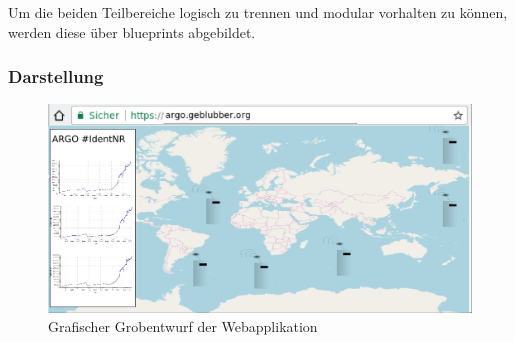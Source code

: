Um die beiden Teilbereiche logisch zu trennen und modular vorhalten zu können, werden diese über blueprints abgebildet.



\subsubsection{Darstellung}
%
%


\begin{figure}[h!]
    \centering
    \includegraphics[width=\textwidth]{pix/EntwurfWebseite.png}
    \caption{Grafischer Grobentwurf der Webapplikation}
    \label{fig:entwurf_webseite}
\end{figure}

